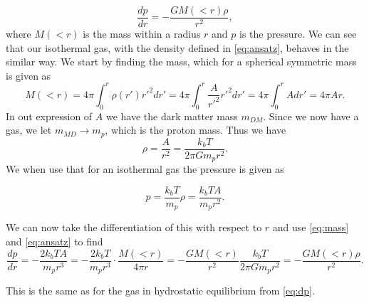 \documentclass[a4paper,norsk, 10pt]{article}
\begin{document}
\begin{equation}\label{eq:dp}
\dfrac{dp}{dr} = - \dfrac{GM(<r)\rho}{r^2},
\end{equation}
where $M(<r)$ is the mass within a radius $r$ and $p$ is the pressure. We can see that our isothermal gas, with the density defined in \eqref{eq:ansatz}, behaves in the similar way. We start by finding the mass, which for a spherical symmetric mass is given as
\begin{equation}\label{eq:mass}
M(<r) = 4\pi \int_0^r \rho(r') r'^2 dr' = 4\pi \int_0^r \dfrac{A}{r'^2} r'^2 dr' = 4\pi \int_0^r A  dr' = 4\pi A r.
\end{equation}
In out expression of $A$ we have the dark matter mass $m_{DM}$. Since we now have a gas, we let $m_{MD} \rightarrow m_p$, which is the proton mass. Thus we have
\begin{equation}
\rho = \dfrac{A}{r^2} = \dfrac{k_b T}{2\pi G m_p r^2}.
\end{equation}
We when use that for an isothermal gas the pressure is given as

\begin{equation}
p = \dfrac{k_b T}{m_p}\rho = \dfrac{k_b T A}{m_p r^2}.
\end{equation}

We can now take the differentiation of this with respect to $r$ and use \eqref{eq:mass} and \eqref{eq:ansatz} to find
\begin{equation}
\frac{dp}{dr} = -\dfrac{2 k_b T A}{m_p r^3} =  -\dfrac{2 k_b T}{m_p r^3} \cdot \dfrac{M(<r)}{4\pi r} = - \frac{GM(<r)}{r^2}\dfrac{k_b T}{2\pi G m_p r^2} =  - \dfrac{GM(<r)\rho}{r^2}.
\end{equation}

This is the same as for the gas in hydrostatic equilibrium from \eqref{eq:dp}.
\end{document}

